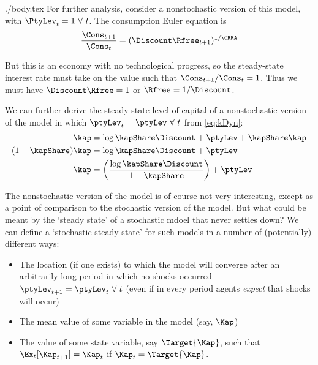 \documentclass{handout}
\begin{document}
\begin{verbatimwrite}{./body.tex}
For further analysis, consider a nonstochastic version of this model, 
with $\PtyLev_{t} = 1 ~ \forall ~ t$.  The consumption Euler equation is 
\begin{equation*}\begin{gathered}\begin{aligned}
        \frac{\Cons_{t+1}}{\Cons_{t}} & =  (\Discount \Rfree_{t+1})^{1/\CRRA}  \\
\end{aligned}\end{gathered}\end{equation*}

But this is an economy with no technological progress, so the steady-state
interest rate must take on the value such that $\Cons_{t+1}/\Cons_{t}=1$.  Thus we
must have $\Discount \Rfree = 1$ or $\Rfree = 1/\Discount$.

We can further derive the steady state level of capital of a nonstochastic version of the model in which $\ptyLev_{t}=\ptyLev~\forall~t$
from \eqref{eq:kDyn}:
\begin{equation}\begin{gathered}\begin{aligned}
  \kap & =  \log \kapShare\Discount  + \ptyLev + \kapShare \kap 
  \\ (1-\kapShare) \kap & =  \log \kapShare\Discount + \ptyLev
\\ \kap & =  \left(\frac{\log \kapShare\Discount}{1-\kapShare}\right) + \ptyLev \label{eq:kSS}
\end{aligned}\end{gathered}\end{equation}

The nonstochastic version of the model is of course not very interesting, except as a point of comparison to the stochastic version of the model.  But what could be meant by the `steady state' of a stochastic mdoel that never settles down?  We can define a `stochastic steady state' for such models in a number of (potentially) different ways:
\begin{itemize}
\item The location (if one exists) to which the model will converge after an arbitrarily long period in which no shocks occurred $\ptyLev_{t+1}=\ptyLev_{t}~\forall~t$ (even if in every period agents \textit{expect} that shocks will occur)
\item The mean value of some variable in the model (say, $\Kap$)
\item The value of some state variable, say $\Target{\Kap}$, such that $\Ex_{t}[\Kap_{t+1}] = \Kap_{t}$ if $\Kap_{t}=\Target{\Kap}$.
\end{itemize}


\end{verbatimwrite}
\end{document}
